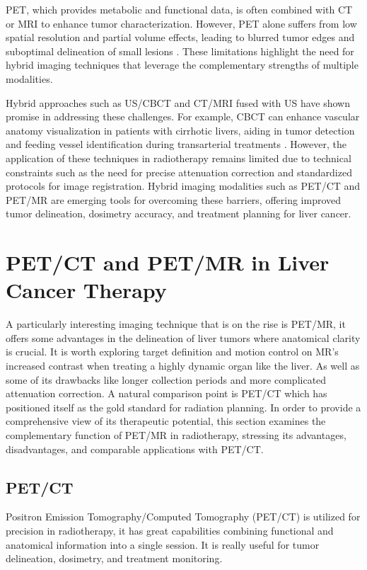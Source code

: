 \documentclass[11pt]{article} %
\begin{document}
\begin{multicols}{2}
PET, which provides metabolic and functional data, is often combined with CT or MRI to enhance tumor characterization. However, PET alone suffers from low spatial resolution and partial volume effects, leading to blurred tumor edges and suboptimal delineation of small lesions \cite{yan2024}. These limitations highlight the need for hybrid imaging techniques that leverage the complementary strengths of multiple modalities.

Hybrid approaches such as US/CBCT and CT/MRI fused with US have shown promise in addressing these challenges. For example, CBCT can enhance vascular anatomy visualization in patients with cirrhotic livers, aiding in tumor detection and feeding vessel identification during transarterial treatments \cite{floridi2022}. However, the application of these techniques in radiotherapy remains limited due to technical constraints such as the need for precise attenuation correction and standardized protocols for image registration. Hybrid imaging modalities such as PET/CT and PET/MR are emerging tools for overcoming these barriers, offering improved tumor delineation, dosimetry accuracy, and treatment planning for liver cancer.


\section{PET/CT and PET/MR in Liver Cancer Therapy}

A particularly interesting imaging technique that is on the rise is PET/MR, it offers some advantages in the delineation of liver tumors where anatomical clarity is crucial. It is worth exploring target definition and motion control on MR's increased contrast when treating a highly dynamic organ like the liver. As well as some of its drawbacks like longer collection periods and more complicated attenuation correction. A natural comparison point is PET/CT which has positioned itself as the gold standard for radiation planning. In order to provide a comprehensive view of its therapeutic potential, this section examines the complementary function of PET/MR in radiotherapy, stressing its advantages, disadvantages, and comparable applications with PET/CT.

\subsection{PET/CT}
Positron Emission Tomography/Computed Tomography (PET/CT) is utilized for precision in radiotherapy, it has great capabilities combining functional and anatomical information into a single session. It is really useful for tumor delineation, dosimetry, and treatment monitoring.


\end{multicols}
\end{document}
